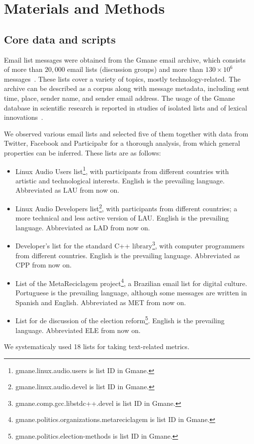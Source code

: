 

\chapter{Materials and Methods}\label{ch:mat}

\section{Core data and scripts}\label{sec:data}\label{scripts}
Email list messages were obtained from
the Gmane email archive, which consists of more than $20,000$
email lists (discussion groups) and more than $130\times 10^6$ messages~\cite{Gmanewikipedia}. These lists cover a variety of topics, mostly technology-related. The archive can be described as a corpus along with message metadata, including sent time, place, sender name, and sender email address.
The usage of the Gmane database in scientific research is reported in studies of isolated lists and of lexical innovations~\cite{Gmane2,bird}. 

We observed various email lists and selected five of them together with data from Twitter, Facebook and Participabr for a thorough analysis,
from which general properties can be inferred. These lists are as follows:

\begin{itemize}
\item Linux Audio Users list\footnote{gmane.linux.audio.users is list ID in Gmane.}, with participants from different countries with artistic and technological interests. English is the prevailing language. Abbreviated as LAU from now on.

\item Linux Audio Developers list\footnote{gmane.linux.audio.devel is list ID in Gmane.}, with participants from different countries; a more technical and less active version of LAU. English is the prevailing language. Abbreviated as LAD from now on.

\item Developer's list for the standard C++ library\footnote{gmane.comp.gcc.libstdc++.devel is list ID in Gmane.}, with computer programmers from different countries. English is the prevailing language. Abbreviated as CPP from now on.
\item List of the MetaReciclagem project\footnote{gmane.politics.organizations.metareciclagem is list ID in Gmane.}, a Brazilian email list for digital culture. Portuguese is the prevailing language, although some messages are written in Spanish and English. Abbreviated as MET from now on.
\item List for de discussion of the election reform\footnote{gmane.politics.election-methods is list ID in Gmane.}. English is the prevailing language. Abbreviated ELE from now on.
\end{itemize} 
We systematicaly used 18 lists for taking text-related metrics.


